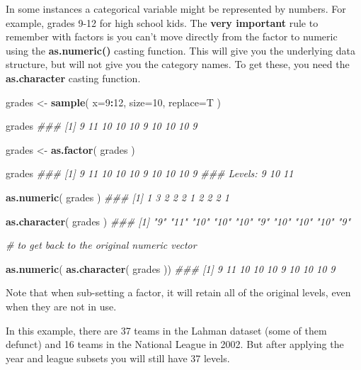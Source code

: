 \documentclass[]{book}
\newenvironment{Shaded}{\begin{snugshade}}{\end{snugshade}}
\newcommand{\CommentTok}[1]{\textcolor[rgb]{0.56,0.35,0.01}{\textit{#1}}}
\newcommand{\DataTypeTok}[1]{\textcolor[rgb]{0.13,0.29,0.53}{#1}}
\newcommand{\DecValTok}[1]{\textcolor[rgb]{0.00,0.00,0.81}{#1}}
\newcommand{\KeywordTok}[1]{\textcolor[rgb]{0.13,0.29,0.53}{\textbf{#1}}}
\newcommand{\NormalTok}[1]{#1}
\newcommand{\OperatorTok}[1]{\textcolor[rgb]{0.81,0.36,0.00}{\textbf{#1}}}
\newcommand{\StringTok}[1]{\textcolor[rgb]{0.31,0.60,0.02}{#1}}
\theoremstyle{definition}
\theoremstyle{definition}
\theoremstyle{definition}
\theoremstyle{remark}
\begin{document}
In some instances a categorical variable might be represented by
numbers. For example, grades 9-12 for high school kids. The \textbf{very
important} rule to remember with factors is you can't move directly from
the factor to numeric using the \textbf{as.numeric()} casting function.
This will give you the underlying data structure, but will not give you
the category names. To get these, you need the \textbf{as.character}
casting function.

\begin{Shaded}
\begin{Highlighting}[]

\NormalTok{grades <-}\StringTok{ }\KeywordTok{sample}\NormalTok{( }\DataTypeTok{x=}\DecValTok{9}\OperatorTok{:}\DecValTok{12}\NormalTok{, }\DataTypeTok{size=}\DecValTok{10}\NormalTok{, }\DataTypeTok{replace=}\NormalTok{T )}

\NormalTok{grades}
\CommentTok{###  [1]  9 11 10 10 10  9 10 10 10  9}

\NormalTok{grades <-}\StringTok{ }\KeywordTok{as.factor}\NormalTok{( grades )}

\NormalTok{grades}
\CommentTok{###  [1] 9  11 10 10 10 9  10 10 10 9 }
\CommentTok{### Levels: 9 10 11}

\KeywordTok{as.numeric}\NormalTok{( grades )}
\CommentTok{###  [1] 1 3 2 2 2 1 2 2 2 1}

\KeywordTok{as.character}\NormalTok{( grades )}
\CommentTok{###  [1] "9"  "11" "10" "10" "10" "9"  "10" "10" "10" "9"}

\CommentTok{# to get back to the original numeric vector}

\KeywordTok{as.numeric}\NormalTok{( }\KeywordTok{as.character}\NormalTok{( grades ))}
\CommentTok{###  [1]  9 11 10 10 10  9 10 10 10  9}
\end{Highlighting}
\end{Shaded}

Note that when sub-setting a factor, it will retain all of the original
levels, even when they are not in use.

In this example, there are 37 teams in the Lahman dataset (some of them
defunct) and 16 teams in the National League in 2002. But after applying
the year and league subsets you will still have 37 levels.
\end{document}

